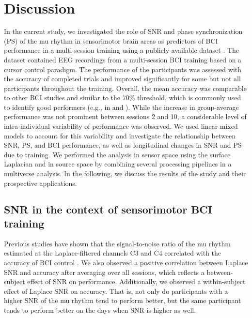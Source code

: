 \section{Discussion} \label{sec:discuss}

In the current study, we investigated the role of SNR and phase synchronization (PS) of the mu rhythm in sensorimotor brain areas as predictors of BCI performance in a multi-session training using a publicly available dataset \citep{Stieger2021_dataset}. The dataset contained EEG recordings from a multi-session BCI training based on a cursor control paradigm. The performance of the participants was assessed with the accuracy of completed trials and improved significantly for some but not all participants throughout the training. Overall, the mean accuracy was comparable to other BCI studies and similar to the 70\% threshold, which is commonly used to identify good performers (e.g., in \cite{Sannelli2019} and \cite{Leeuwis2021}). While the increase in group-average performance was not prominent between sessions 2 and 10, a considerable level of intra-individual variability of performance was observed. We used linear mixed models to account for this variability and investigate the relationship between SNR, PS, and BCI performance, as well as longitudinal changes in SNR and PS due to training. We performed the analysis in sensor space using the surface Laplacian and in source space by combining several processing pipelines in a multiverse analysis. In the following, we discuss the results of the study and their prospective applications.

\subsection{SNR in the context of sensorimotor BCI training}

Previous studies have shown that the signal-to-noise ratio of the mu rhythm estimated at the Laplace-filtered channels C3 and C4 correlated with the accuracy of BCI control \citep{Blankertz2010, Acqualagna2016, Sannelli2019}. We also observed a positive correlation between Laplace SNR and accuracy after averaging over all sessions, which reflects a between-subject effect of SNR on performance. Additionally, we observed a within-subject effect of Laplace SNR on accuracy. That is, not only do participants with a higher SNR of the mu rhythm tend to perform better, but the same participant tends to perform better on the days when SNR is higher as well. 

